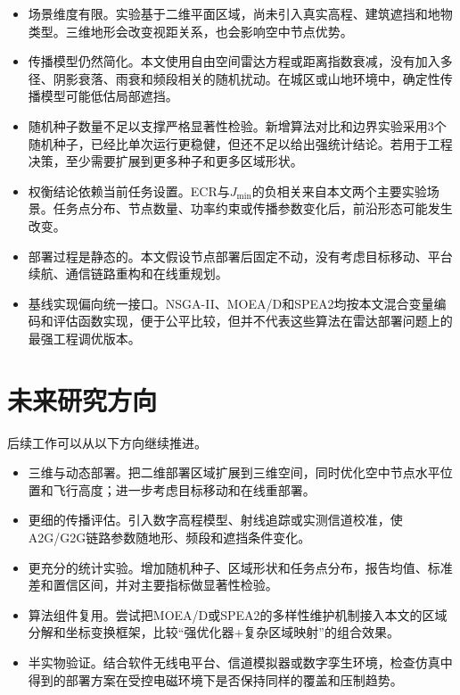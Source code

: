 \begin{itemize}
    \item 场景维度有限。实验基于二维平面区域，尚未引入真实高程、建筑遮挡和地物类型。三维地形会改变视距关系，也会影响空中节点优势。

    \item 传播模型仍然简化。本文使用自由空间雷达方程或距离指数衰减，没有加入多径、阴影衰落、雨衰和频段相关的随机扰动。在城区或山地环境中，确定性传播模型可能低估局部遮挡。

    \item 随机种子数量不足以支撑严格显著性检验。新增算法对比和边界实验采用3个随机种子，已经比单次运行更稳健，但还不足以给出强统计结论。若用于工程决策，至少需要扩展到更多种子和更多区域形状。

    \item 权衡结论依赖当前任务设置。ECR与$J_{\min}$的负相关来自本文两个主要实验场景。任务点分布、节点数量、功率约束或传播参数变化后，前沿形态可能发生改变。

    \item 部署过程是静态的。本文假设节点部署后固定不动，没有考虑目标移动、平台续航、通信链路重构和在线重规划。

    \item 基线实现偏向统一接口。NSGA-II、MOEA/D和SPEA2均按本文混合变量编码和评估函数实现，便于公平比较，但并不代表这些算法在雷达部署问题上的最强工程调优版本。
\end{itemize}

\section{未来研究方向}

后续工作可以从以下方向继续推进。

\begin{itemize}
    \item 三维与动态部署。把二维部署区域扩展到三维空间，同时优化空中节点水平位置和飞行高度；进一步考虑目标移动和在线重部署。

    \item 更细的传播评估。引入数字高程模型、射线追踪或实测信道校准，使A2G/G2G链路参数随地形、频段和遮挡条件变化。

    \item 更充分的统计实验。增加随机种子、区域形状和任务点分布，报告均值、标准差和置信区间，并对主要指标做显著性检验。

    \item 算法组件复用。尝试把MOEA/D或SPEA2的多样性维护机制接入本文的区域分解和坐标变换框架，比较“强优化器+复杂区域映射”的组合效果。

    \item 半实物验证。结合软件无线电平台、信道模拟器或数字孪生环境，检查仿真中得到的部署方案在受控电磁环境下是否保持同样的覆盖和压制趋势。
\end{itemize}
